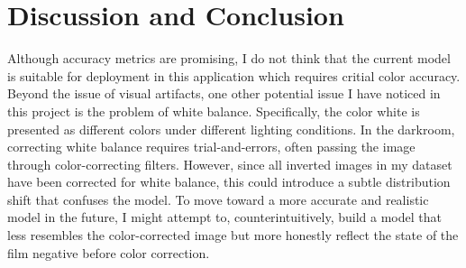 \documentclass[twoside,11pt]{article}
\begin{document}
\section{Discussion and Conclusion}
\label{sec:discussion}
Although accuracy metrics are promising, I do not think that the current model is suitable for deployment in this application which requires critial color accuracy.
Beyond the issue of visual artifacts, one other potential issue I have noticed in this project is the problem of white balance. 
Specifically, the color white is presented as different colors under different lighting conditions. 
In the darkroom, correcting white balance requires trial-and-errors, often passing the image through color-correcting filters. 
However, since all inverted images in my dataset have been corrected for white balance, this could introduce a 
subtle distribution shift that confuses the model. To move toward a more accurate and realistic model in the future, I might attempt to, 
counterintuitively, build a model that less resembles the color-corrected image but more honestly reflect the state of the film negative before color correction.
\newpage

\end{document}
